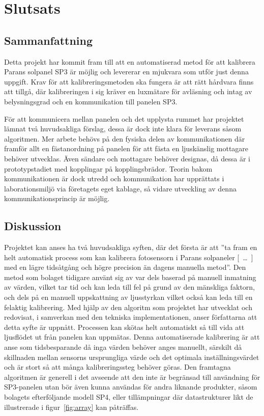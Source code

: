 \section{Slutsats} %
\label{sec:slutsats}
    \subsection{Sammanfattning} %
    \label{sub:sammanfattning}
        Detta projekt har kommit fram till att en automatiserad metod för att kalibrera Parans solpanel SP3 är möjlig och levererar en mjukvara som utför just denna uppgift. Krav för att kalibreringsmetoden ska fungera är att rätt hårdvara finns att tillgå, där kalibreringen i sig kräver en luxmätare för avläsning och intag av belysningsgrad och en kommunikation till panelen SP3.\bigskip 

        För att kommunicera mellan panelen och det upplysta rummet har projektet lämnat två huvudsakliga förslag, dessa är dock inte klara för leverans såsom algoritmen. Mer arbete behövs på den fysiska delen av kommunikationen där framför allt en fästanordning på panelen för att fästa en ljuskänslig mottagare behöver utvecklas. Även sändare och mottagare behöver designas, då dessa är i prototypstadiet med kopplingar på kopplingsbrädor. Teorin bakom kommunikationen är dock utredd och kommunikation har upprättats i laborationsmiljö via företagets eget kablage, så vidare utveckling av denna kommunikationsprincip är möjlig.

    \subsection{Diskussion} %
    \label{sub:diskussion}
        Projektet kan anses ha två huvudsakliga syften, där det första är att ''ta fram en helt automatisk process som kan kalibrera fotosensorn i Parans solpaneler [~\dots~] med en lägre tidsåtgång och högre precision än dagens manuella metod''. 
        Den metod som bolaget tidigare använt sig av var dels baserad på manuell inmatning av värden, vilket tar tid och kan leda till fel på grund av den mänskliga faktorn, och dels på en manuell uppskattning av ljusstyrkan vilket också kan leda till en felaktig kalibrering. 
        Med hjälp av den algoritm som projektet har utvecklat och redovisat, i samverkan med den tekniska implementationen, anser författarna att detta syfte är uppnått. Processen kan skötas helt automatiskt så till vida att ljusflödet ut från panelen kan uppmätas. 
        Denna automatiserade kalibrering är att anse som tidsbesparande då inga värden behöver anges manuellt, särskilt då skillnaden mellan sensorns ursprungliga värde och det optimala inställningsvärdet och är stort så att många kalibreringssteg behöver göras. Den framtagna algoritmen är generell i det avseende att den inte är begränsad till användning för SP3-panelen utan bör även kunna användas för andra liknande produkter, såsom bolagets efterföljande modell SP4, eller tillämpningar där datastrukturer likt de illustrerade i figur~\ref{fig:array} kan påträffas.\bigskip

